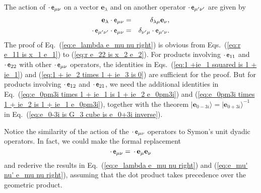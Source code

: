 \documentclass[11pt,twocolumn]{article}
\begin{document}
The action of $\cdot\,\textsf e_{\mu\nu}$ on a vector $\mathbf e_\lambda$  and on another operator $\cdot\,\textsf e_{\mu'\nu'}$ are given by
\begin{eqnarray}
\label{eq:e_lambda e_mu nu right}
\mathbf e_{\lambda}\cdot\textsf e_{\mu\nu}&=&\delta_{\lambda\mu}\mathbf e_\nu,\\
\label{eq:e_mu' nu' e_mu nu right}
\cdot\,\textsf e_{\mu'\nu'}\cdot\textsf e_{\mu\nu}&=&\delta_{\nu'\mu}\cdot\textsf e_{\mu'\nu}.
\end{eqnarray}
The proof of Eq.~(\ref{eq:e_lambda e_mu nu right}) is obvious from Eqs.~(\ref{eq:r e_11 is x_1 e_1}) to (\ref{eq:r e_22 is x_2 e_2}).  For products involving $\cdot\,\textsf e_{11}$ and $\cdot\,\textsf e_{22}$ with other $\cdot\,\textsf e_{\mu\nu}$ operators, the identities in Eqs.~(\ref{eq:1 +ie_1 squared is 1 + ie_1}) and (\ref{eq:1 + ie_2 times 1 + ie_3 is 0}) are sufficient for the proof.  But for products involving $\cdot\,\textsf e_{12}$ and $\cdot\,\textsf e_{21}$, we need the additional identities in Eq.~(\ref{eq:e_0pm3i times 1 + ie_1 is 1 + ie_2 e_0pm3i}) and (\ref{eq:e_0pm3i times 1 + ie_2 is 1 + ie_1 e_0pm3i}), together with the theorem $|\mathbf e_{0-3i}\rangle=|\mathbf e_{0+3i}\rangle^{-1}$ in Eq.~(\ref{eq:e_0-3i is G_3 cube is e_0+3i inverse}).  

Notice the similarity of the action of the $\cdot\,\textsf e_{\mu\nu}$ operators to Symon's unit dyadic operators\cite{Symon_1971_Mechanics_p406}.  In fact, we could make the formal replacement
\begin{equation}
\label{eq:e_munu is e_mu e_nu right}
\cdot\,\textsf e_{\mu\nu}=\,\cdot\,\mathbf e_\mu\mathbf e_\nu
\end{equation}
and rederive the results in Eq.~(\ref{eq:e_lambda e_mu nu right}) and (\ref{eq:e_mu' nu' e_mu nu right}), assuming that the dot product takes precedence over the geometric product.
\end{document}
